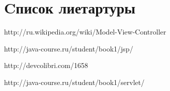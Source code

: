 \chapter{Cписок лиетартуры}

http://ru.wikipedia.org/wiki/Model-View-Controller

http://java-course.ru/student/book1/jsp/

http://devcolibri.com/1658

http://java-course.ru/student/book1/servlet/





